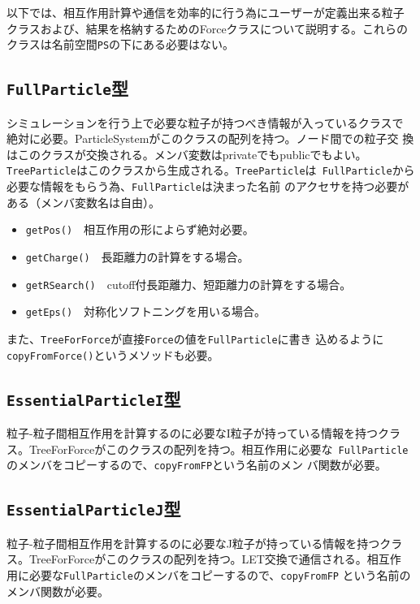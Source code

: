 以下では、相互作用計算や通信を効率的に行う為にユーザーが定義出来る粒子
クラスおよび、結果を格納するためのForceクラスについて説明する。これらの
クラスは名前空間{\tt PS}の下にある必要はない。

\subsection{{\tt FullParticle}型}

シミュレーションを行う上で必要な粒子が持つべき情報が入っているクラスで
絶対に必要。ParticleSystemがこのクラスの配列を持つ。ノード間での粒子交
換はこのクラスが交換される。メンバ変数はprivateでもpublicでもよい。
{\tt TreeParticle}はこのクラスから生成される。{\tt TreeParticle}は{\tt
FullParticle}から必要な情報をもらう為、{\tt FullParticle}は決まった名前
のアクセサを持つ必要がある（メンバ変数名は自由）。

\begin{itemize} 
\item {\tt getPos()}　相互作用の形によらず絶対必要。
\item {\tt getCharge()}　長距離力の計算をする場合。
\item {\tt getRSearch()}　cutoff付長距離力、短距離力の計算をする場合。
\item {\tt getEps()}　対称化ソフトニングを用いる場合。
\end{itemize}

また、{\tt TreeForForce}が直接{\tt Force}の値を{\tt FullParticle}に書き
込めるように{\tt copyFromForce()}というメソッドも必要。

\subsection{{\tt EssentialParticleI}型}

粒子-粒子間相互作用を計算するのに必要なI粒子が持っている情報を持つクラ
ス。TreeForForceがこのクラスの配列を持つ。相互作用に必要な{\tt
FullParticle}のメンバをコピーするので、{\tt copyFromFP}という名前のメン
バ関数が必要。

\subsection{{\tt EssentialParticleJ}型}

粒子-粒子間相互作用を計算するのに必要なJ粒子が持っている情報を持つクラ
ス。TreeForForceがこのクラスの配列を持つ。LET交換で通信される。相互作
用に必要な{\tt FullParticle}のメンバをコピーするので、{\tt copyFromFP}
という名前のメンバ関数が必要。

